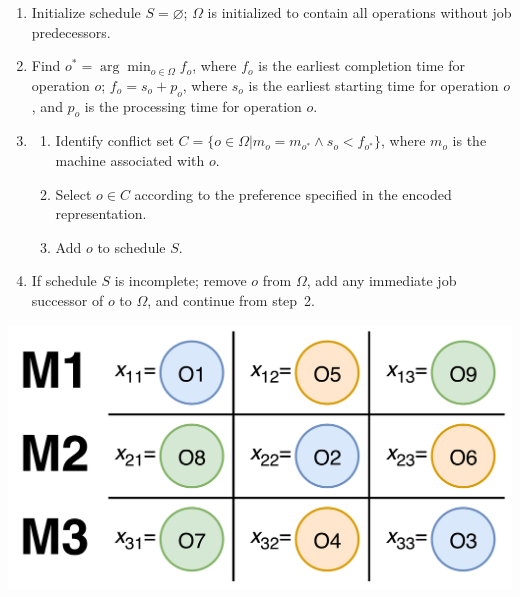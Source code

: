 \documentclass[paper=a4, fontsize=9pt]{scrartcl}
\begin{document}
\begin{multicols}{2}
\begin{enumerate}
    \item Initialize schedule $S=\varnothing$; $\Omega$ is initialized to contain all operations without job predecessors.
    \item Find $o^*=\arg \min_{o \in \Omega} f_o$, where $f_o$ is the earliest completion time for operation $o$; $f_o = s_o + p_o$, where $s_o$ is the earliest starting time for operation $o$, and $p_o$ is the processing time for operation $o$.
    \item \begin{enumerate}
        \item Identify conflict set $C = \{ o \in \Omega \vert m_o = m_{o^*} \land s_o < f_{o^*} \}$, where $m_o$ is the machine associated with $o$.
        \item Select $o \in C$ according to the preference specified in the encoded representation.
        \item Add $o$ to schedule $S$.
    \end{enumerate}
    \item If schedule $S$ is incomplete; remove $o$ from $\Omega$, add any immediate job successor of $o$ to $\Omega$, and continue from step~2.
\end{enumerate}

{
\vspace{0.3cm}
\centering
\includegraphics[scale=0.2]{figures/permve-ntnu-it3708-project-4-2017-schedule-representation}
\label{figure:representation}
\vspace{0.3cm}
}


\end{multicols}
\end{document}
